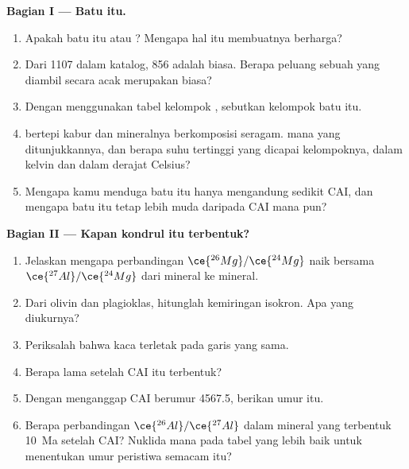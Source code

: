 \begin{problem}
\medskip
\noindent\textbf{Bagian I --- Batu itu.}
\begin{enumerate}
  \item Apakah batu itu  atau ? Mengapa hal itu membuatnya berharga?
  \item Dari \num{1107}  dalam katalog, 856 adalah  biasa. Berapa
        peluang sebuah  yang diambil secara acak merupakan  biasa?
  \item Dengan menggunakan tabel kelompok , sebutkan kelompok batu itu.
  \item {} bertepi kabur dan mineralnya berkomposisi
        seragam.  mana yang ditunjukkannya, dan berapa
        suhu tertinggi yang dicapai kelompoknya, dalam kelvin dan dalam derajat Celsius?
  \item Mengapa kamu menduga batu itu hanya mengandung sedikit CAI, dan mengapa batu itu tetap
        lebih muda daripada CAI mana pun?
\end{enumerate}

\noindent\textbf{Bagian II --- Kapan kondrul itu terbentuk?}
\begin{enumerate}[resume]
  \item Jelaskan mengapa perbandingan $\ce{^{26}Mg}/\ce{^{24}Mg}$ naik bersama
        $\ce{^{27}Al}/\ce{^{24}Mg}$ dari mineral ke mineral.
  \item Dari olivin dan plagioklas, hitunglah kemiringan isokron.
        Apa yang diukurnya?
  \item Periksalah bahwa kaca terletak pada garis yang sama.
  \item Berapa lama setelah CAI  itu terbentuk?
  \item Dengan menganggap CAI berumur \qty{4567.5}{\Ma}, berikan umur  itu.
  \item Berapa perbandingan $\ce{^{26}Al}/\ce{^{27}Al}$ dalam mineral yang terbentuk
        \qty{10}{Ma} setelah CAI? Nuklida mana pada tabel yang lebih baik untuk menentukan umur
        peristiwa semacam itu?
\end{enumerate}


\end{problem}
